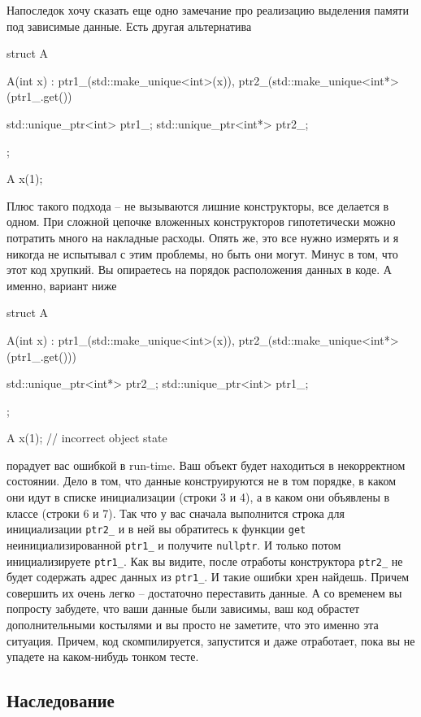 \documentclass{article}
\begin{document}
Напоследок хочу сказать еще одно замечание про реализацию выделения памяти под зависимые данные. Есть другая альтернатива
\begin{cppcode}
struct A {
  A(int x)
   : ptr1_(std::make_unique<int>(x)),
     ptr2_(std::make_unique<int*>(ptr1_.get()) {}
  
  std::unique_ptr<int> ptr1_;
  std::unique_ptr<int*> ptr2_;
};

A x(1);
\end{cppcode}
Плюс такого подхода -- не вызываются лишние конструкторы, все делается в одном. При сложной цепочке вложенных конструкторов гипотетически можно потратить много на накладные расходы. Опять же, это все нужно измерять и я никогда не испытывал с этим проблемы, но быть они могут. Минус в том, что этот код хрупкий. Вы опираетесь на порядок расположения данных в коде. А именно, вариант ниже
\begin{cppcode}
struct A {
  A(int x)
   : ptr1_(std::make_unique<int>(x)),
     ptr2_(std::make_unique<int*>(ptr1_.get())) {}
  
  std::unique_ptr<int*> ptr2_;
  std::unique_ptr<int> ptr1_;
};

A x(1); // incorrect object state
\end{cppcode}
порадует вас ошибкой в run-time. Ваш объект будет находиться в некорректном состоянии. Дело в том, что данные конструируются не в том порядке, в каком они идут в списке инициализации (строки 3 и 4), а в каком они объявлены в классе (строки 6 и 7). Так что у вас сначала выполнится строка для инициализации \verb"ptr2_" и в ней вы обратитесь к функции \verb"get" неинициализированной \verb"ptr1_" и получите \verb"nullptr". И только потом инициализируете \verb"ptr1_". Как вы видите, после отработы конструктора \verb"ptr2_" не будет содержать адрес данных из \verb"ptr1_". И такие ошибки хрен найдешь. Причем совершить их очень легко -- достаточно переставить данные. А со временем вы попросту забудете, что ваши данные были зависимы, ваш код обрастет дополнительными костылями и вы просто не заметите, что это именно эта ситуация. Причем, код скомпилируется, запустится и даже отработает, пока вы не упадете на каком-нибудь тонком тесте.


\subsection{Наследование}
\end{document}
